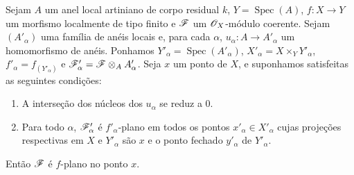 \begin{proposition}[11.4.12]
\label{IV.11.4.12}
Sejam $A$ um anel local
artiniano de corpo residual
$k$, $Y=\operatorname{Spec}(A)$,
$f:X\to Y$ um morfismo
localmente de tipo finito
e $\mathscr{F}$ um
$\mathscr{O}_X$-módulo coerente.
Sejam $(A'_\alpha)$ uma
família de anéis locais e,
para cada $\alpha$,
$u_\alpha:A\to A'_\alpha$
um homomorfismo de anéis.
Ponhamos
$Y'_\alpha=\operatorname{Spec}(A'_\alpha)$,
$X'_\alpha=X\times_Y Y'_\alpha$,
$f'_\alpha=f_{(Y'_\alpha)}$
e $\mathscr{F}'_\alpha=
\mathscr{F}\otimes_A A'_\alpha$.
Seja $x$ um ponto de $X$,
e suponhamos satisfeitas
as seguintes condições:
\begin{enumerate}[label=(\roman*)]
\item A interseção dos
núcleos dos $u_\alpha$
se reduz a $0$.
\item Para todo $\alpha$,
$\mathscr{F}'_\alpha$ é
$f'_\alpha$-plano em todos
os pontos
$x'_\alpha\in X'_\alpha$
cujas projeções respectivas
em $X$ e $Y'_\alpha$
são $x$ e o ponto fechado
$y'_\alpha$ de
$Y'_\alpha$.
\end{enumerate}
Então $\mathscr{F}$ é
$f$-plano no ponto $x$.
\end{proposition}

